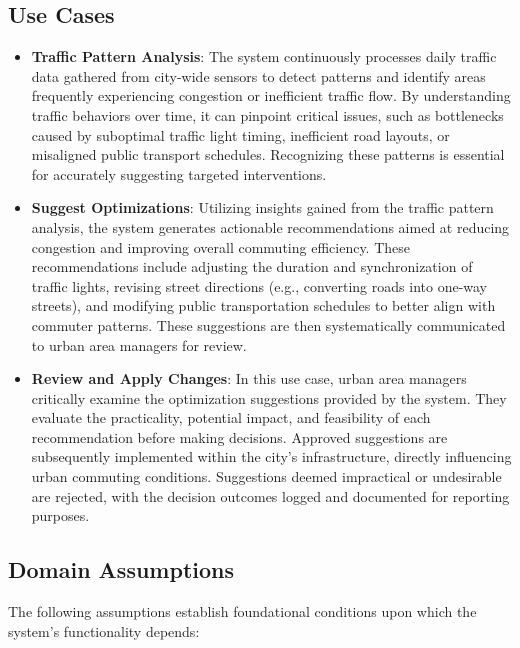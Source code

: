 \documentclass[a4paper,12pt]{article}
\begin{document}
\subsection{Use Cases}

\begin{itemize}
    \item \textbf{Traffic Pattern Analysis}:
The system continuously processes daily traffic data gathered from city-wide sensors to detect patterns and identify areas frequently experiencing congestion or inefficient traffic flow. By understanding traffic behaviors over time, it can pinpoint critical issues, such as bottlenecks caused by suboptimal traffic light timing, inefficient road layouts, or misaligned public transport schedules. Recognizing these patterns is essential for accurately suggesting targeted interventions.

\item \textbf{Suggest Optimizations}:
Utilizing insights gained from the traffic pattern analysis, the system generates actionable recommendations aimed at reducing congestion and improving overall commuting efficiency. These recommendations include adjusting the duration and synchronization of traffic lights, revising street directions (e.g., converting roads into one-way streets), and modifying public transportation schedules to better align with commuter patterns. These suggestions are then systematically communicated to urban area managers for review.

\item \textbf{Review and Apply Changes}:
In this use case, urban area managers critically examine the optimization suggestions provided by the system. They evaluate the practicality, potential impact, and feasibility of each recommendation before making decisions. Approved suggestions are subsequently implemented within the city’s infrastructure, directly influencing urban commuting conditions. Suggestions deemed impractical or undesirable are rejected, with the decision outcomes logged and documented for reporting purposes.
\end{itemize}

\subsection{Domain Assumptions}

The following assumptions establish foundational conditions upon which the system's functionality depends:
\end{document}
